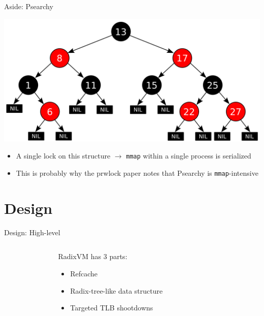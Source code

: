 \documentclass[aspectratio=169]{beamer}
\newcommand{\bi}{\begin{itemize}}
\newcommand{\ei}{\end{itemize}}
\begin{document}
\begin{frame}{Aside: Psearchy}
  \begin{center}
    \includegraphics[scale=0.2]{./figures/Red-black_tree.png}
  \end{center}
    \bi
  \item {\color{red}A single lock on this structure} $\rightarrow$ \texttt{mmap} within a single process is serialized
    \item This is probably why the prwlock paper notes that Psearchy is \texttt{mmap}-intensive
    \ei
\end{frame}

\section{Design}

\begin{frame}{Design: High-level}
  \begin{columns}[T]
    \begin{column}{0.3\textwidth}
    \end{column}
    \begin{column}{0.4\textwidth}
      RadixVM has 3 parts:
      \bi
      \pause
    \item {\color<5>{red}Refcache}
      \pause
    \item Radix-tree-like data structure
      \pause
    \item Targeted TLB shootdowns
      \ei
    \end{column}
    \begin{column}{0.3\textwidth}
    \end{column}
  \end{columns}
\end{frame}
\end{document}
